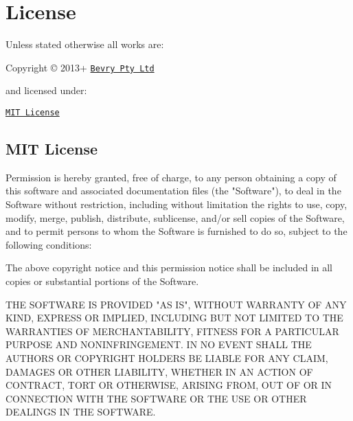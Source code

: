 \section*{License}

Unless stated otherwise all works are\+:


\begin{DoxyItemize}
\item Copyright \copyright{} 2013+ \href{http://bevry.me}{\tt Bevry Pty Ltd}
\end{DoxyItemize}

and licensed under\+:


\begin{DoxyItemize}
\item \href{http://spdx.org/licenses/MIT.html}{\tt M\+IT License}
\end{DoxyItemize}

\subsection*{M\+IT License}


\begin{DoxyPre}
Permission is hereby granted, free of charge, to any person obtaining a copy of this software and associated documentation files (the "Software"), to deal in the Software without restriction, including without limitation the rights to use, copy, modify, merge, publish, distribute, sublicense, and/or sell copies of the Software, and to permit persons to whom the Software is furnished to do so, subject to the following conditions:\end{DoxyPre}



\begin{DoxyPre}The above copyright notice and this permission notice shall be included in all copies or substantial portions of the Software.\end{DoxyPre}



\begin{DoxyPre}THE SOFTWARE IS PROVIDED "AS IS", WITHOUT WARRANTY OF ANY KIND, EXPRESS OR IMPLIED, INCLUDING BUT NOT LIMITED TO THE WARRANTIES OF MERCHANTABILITY, FITNESS FOR A PARTICULAR PURPOSE AND NONINFRINGEMENT. IN NO EVENT SHALL THE AUTHORS OR COPYRIGHT HOLDERS BE LIABLE FOR ANY CLAIM, DAMAGES OR OTHER LIABILITY, WHETHER IN AN ACTION OF CONTRACT, TORT OR OTHERWISE, ARISING FROM, OUT OF OR IN CONNECTION WITH THE SOFTWARE OR THE USE OR OTHER DEALINGS IN THE SOFTWARE.
\end{DoxyPre}
 